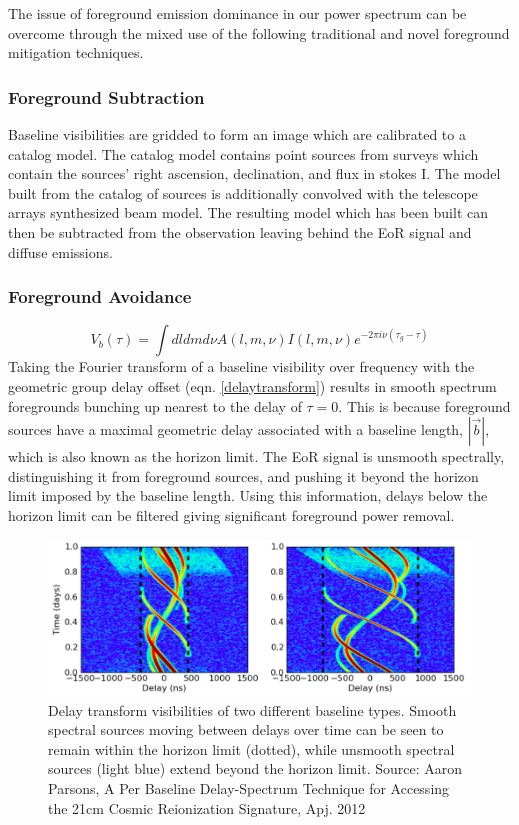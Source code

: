 \documentclass[a0,landscape]{a0poster}
\begin{document}
\begin{multicols}{4}
The issue of foreground emission dominance in our power spectrum can be overcome through the mixed use of the following traditional and novel foreground mitigation techniques. \\
\subsubsection*{Foreground Subtraction}
Baseline visibilities are gridded to form an image which are calibrated to a catalog model. The catalog model contains point sources from surveys which contain the sources' right ascension, declination, and flux in stokes I. The model built from the catalog of sources is additionally convolved with the telescope arrays synthesized beam model. The resulting model which has been built can then be subtracted from the observation leaving behind the EoR signal and diffuse emissions.
\subsubsection*{Foreground Avoidance}
\begin{equation}
\label{delaytransform}
V_b(\tau) = \int dl dm d\nu A(l,m,\nu)I(l,m,\nu)e^{-2\pi i\nu(\tau_g -\tau)}
\end{equation}
Taking the Fourier transform of a baseline visibility over frequency with the geometric group delay offset (eqn. \ref{delaytransform}) results in smooth spectrum foregrounds bunching up nearest to the delay of $\tau = 0$. This is because foreground sources have a maximal geometric delay associated with a baseline length, $|\vec{b}|$, which is also known as the horizon limit. The EoR signal is unsmooth spectrally, distinguishing it from foreground sources, and pushing it beyond the horizon limit imposed by the baseline length. Using this information, delays below the horizon limit can be filtered giving significant foreground power removal.

\begin{figure}[H]
\centering
\label{foregroundsrcs}
\includegraphics[width=0.8\linewidth]{figures/delaytransform.png}
\caption{Delay transform visibilities of two different baseline types. Smooth spectral sources moving between delays over time can be seen to remain within the horizon limit (dotted), while unsmooth spectral sources (light blue) extend beyond the horizon limit.  Source: Aaron Parsons, A Per Baseline Delay-Spectrum Technique for Accessing the 21cm Cosmic Reionization Signature, Apj. 2012}
\end{figure}


\end{multicols}
\end{document}
